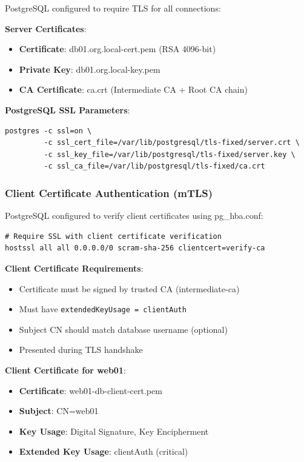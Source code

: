 PostgreSQL configured to require TLS for all connections:

\textbf{Server Certificates}:
\begin{itemize}
    \item \textbf{Certificate}: db01.org.local-cert.pem (RSA 4096-bit)
    \item \textbf{Private Key}: db01.org.local-key.pem
    \item \textbf{CA Certificate}: ca.crt (Intermediate CA + Root CA chain)
\end{itemize}

\textbf{PostgreSQL SSL Parameters}:
\begin{verbatim}
postgres -c ssl=on \
         -c ssl_cert_file=/var/lib/postgresql/tls-fixed/server.crt \
         -c ssl_key_file=/var/lib/postgresql/tls-fixed/server.key \
         -c ssl_ca_file=/var/lib/postgresql/tls-fixed/ca.crt
\end{verbatim}

\subsubsection{Client Certificate Authentication (mTLS)}

PostgreSQL configured to verify client certificates using pg\_hba.conf:

\begin{verbatim}
# Require SSL with client certificate verification
hostssl all all 0.0.0.0/0 scram-sha-256 clientcert=verify-ca
\end{verbatim}

\textbf{Client Certificate Requirements}:
\begin{itemize}
    \item Certificate must be signed by trusted CA (intermediate-ca)
    \item Must have \texttt{extendedKeyUsage = clientAuth}
    \item Subject CN should match database username (optional)
    \item Presented during TLS handshake
\end{itemize}

\textbf{Client Certificate for web01}:
\begin{itemize}
    \item \textbf{Certificate}: web01-db-client-cert.pem
    \item \textbf{Subject}: CN=web01
    \item \textbf{Key Usage}: Digital Signature, Key Encipherment
    \item \textbf{Extended Key Usage}: clientAuth (critical)
\end{itemize}

